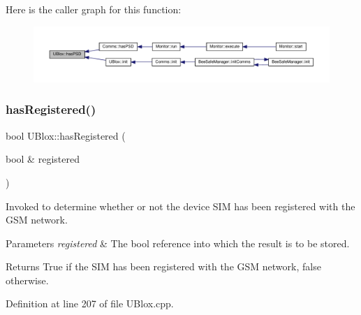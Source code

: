 Here is the caller graph for this function\+:
\nopagebreak
\begin{figure}[H]
\begin{center}
\leavevmode
\includegraphics[width=350pt]{da/df6/class_u_blox_ae49b51a602a327b5eff5b04d2ccaec20_icgraph}
\end{center}
\end{figure}
\mbox{\label{class_u_blox_a1889c2b9bb6087bc939bd2a27b68623b}} 
\subsubsection{\texorpdfstring{has\+Registered()}{hasRegistered()}}
{\footnotesize\ttfamily bool U\+Blox\+::has\+Registered (\begin{DoxyParamCaption}\item[{bool \&}]{registered }\end{DoxyParamCaption})}

Invoked to determine whether or not the device S\+IM has been registered with the G\+SM network.


\begin{DoxyParams}{Parameters}
{\em registered} & The bool reference into which the result is to be stored. \\
\hline
\end{DoxyParams}
\begin{DoxyReturn}{Returns}
True if the S\+IM has been registered with the G\+SM network, false otherwise. 
\end{DoxyReturn}


Definition at line 207 of file U\+Blox.\+cpp.


